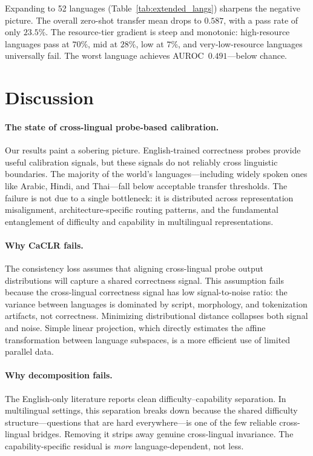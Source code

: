 \documentclass[11pt,a4paper]{article}
\begin{document}
Expanding to 52 languages (Table~\ref{tab:extended_langs}) sharpens the negative picture.
The overall zero-shot transfer mean drops to $0.587$, with a pass rate of only $23.5$\%.
The resource-tier gradient is steep and monotonic: high-resource languages pass at $70$\%, mid at $28$\%, low at $7$\%, and very-low-resource languages universally fail.
The worst language achieves AUROC~$0.491$---below chance.

\section{Discussion}

\paragraph{The state of cross-lingual probe-based calibration.}
Our results paint a sobering picture.
English-trained correctness probes provide useful calibration signals, but these signals do not reliably cross linguistic boundaries.
The majority of the world's languages---including widely spoken ones like Arabic, Hindi, and Thai---fall below acceptable transfer thresholds.
The failure is not due to a single bottleneck: it is distributed across representation misalignment, architecture-specific routing patterns, and the fundamental entanglement of difficulty and capability in multilingual representations.

\paragraph{Why CaCLR fails.}
The consistency loss assumes that aligning cross-lingual probe output distributions will capture a shared correctness signal.
This assumption fails because the cross-lingual correctness signal has low signal-to-noise ratio: the variance between languages is dominated by script, morphology, and tokenization artifacts, not correctness.
Minimizing distributional distance collapses both signal and noise.
Simple linear projection, which directly estimates the affine transformation between language subspaces, is a more efficient use of limited parallel data.

\paragraph{Why decomposition fails.}
The English-only literature reports clean difficulty--capability separation.
In multilingual settings, this separation breaks down because the shared difficulty structure---questions that are hard everywhere---is one of the few reliable cross-lingual bridges.
Removing it strips away genuine cross-lingual invariance.
The capability-specific residual is \emph{more} language-dependent, not less.
\end{document}
